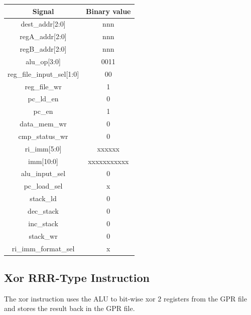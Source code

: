 \documentclass{article}
\begin{document}
\begin{par}
	\begin{center}
		\begin{tabular}{|c|c|}
			\hline 
			\textbf{Signal} & \textbf{Binary value} \\ 
			\hline 
			dest\_addr[2:0] & nnn \\ 
			\hline 
			regA\_addr[2:0] & nnn \\ 
			\hline 
			regB\_addr[2:0] & nnn \\ 
			\hline 
			alu\_op[3:0] & 0011 \\ 
			\hline 
			reg\_file\_input\_sel[1:0] & 00 \\ 
			\hline 
			reg\_file\_wr & 1 \\ 
			\hline 
			pc\_ld\_en & 0 \\ 
			\hline 
			pc\_en & 1 \\ 
			\hline 
			data\_mem\_wr & 0 \\ 
			\hline 
			cmp\_status\_wr & 0 \\ 
			\hline 
			ri\_imm[5:0] & xxxxxx \\ 
			\hline 
			imm[10:0] & xxxxxxxxxxx \\ 
			\hline 
			alu\_input\_sel & 0 \\ 
			\hline 
			pc\_load\_sel & x \\ 
			\hline 
			stack\_ld & 0 \\ 
			\hline 
			dec\_stack & 0 \\ 
			\hline 
			inc\_stack & 0 \\ 
			\hline 
			stack\_wr & 0 \\ 
			\hline 
			ri\_imm\_format\_sel & x \\ 
			\hline 
		\end{tabular} 
	\end{center}

	\newpage
	\subsection{Xor RRR-Type Instruction}
	
	The xor instruction uses the ALU to bit-wise xor 2 registers from the GPR file and stores the result back in the GPR file. \\
	

\end{par}
\end{document}
